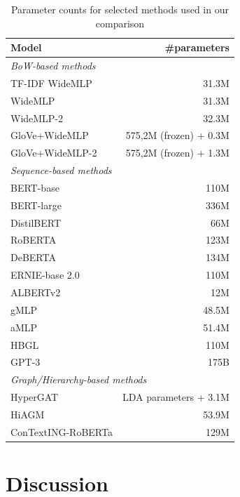 \documentclass[acmsmall,nonacm]{acmart}
\newcommand{\mlp}{WideMLP\xspace}
\begin{document}
\begin{table}[ht]
    \small
    \centering
    \caption{Parameter counts for selected methods used in our comparison}\label{tab:num_params}
    \begin{tabular}{lr}
    \toprule
    \textbf{Model} & \textbf{\#parameters}  \\
    \midrule
    \textit{BoW-based methods} & \\
         TF-IDF \mlp & 31.3M\\
         \mlp & 31.3M\\
         \mlp-2 & 32.3M \\
         GloVe+\mlp & 575,2M (frozen) + 0.3M\\
         GloVe+\mlp-2 & 575,2M (frozen) +  1.3M\\

\midrule

    \textit{Sequence-based methods} &  \\
         BERT-base & 110M\\
         BERT-large & 336M\\ 
         DistilBERT  & 66M\\
         RoBERTA  & 123M\\
         DeBERTA  & 134M\\
         ERNIE-base 2.0 & 110M \\         
         ALBERTv2 & 12M \\         
         gMLP & 48.5M\\
         aMLP & 51.4M\\
        HBGL & 110M\\ 
        GPT-3 & 175B\\

\midrule

    \multicolumn{2}{l}{    \textit{Graph/Hierarchy-based methods}  }\\
        HyperGAT & LDA parameters + 3.1M\\
         HiAGM & 53.9M\\
         ConTextING-RoBERTa & 129M \\

\bottomrule
    \end{tabular}
\end{table}

\section{Discussion}\label{sec:findings}
\end{document}
